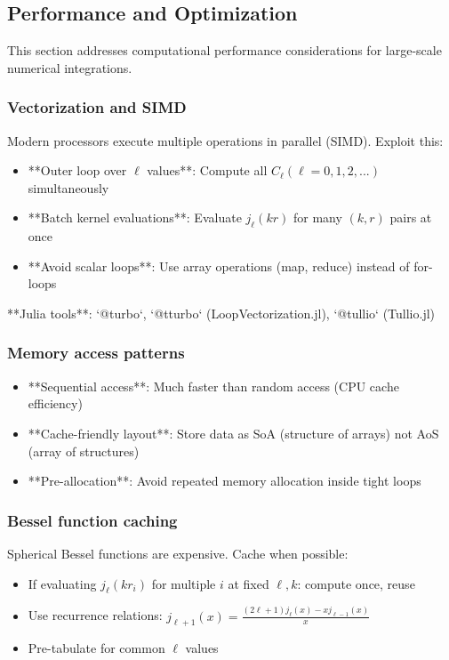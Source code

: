 \subsection{Performance and Optimization}\label{subsec:num_performance}

This section addresses computational performance considerations for large-scale numerical integrations.

\subsubsection{Vectorization and SIMD}

Modern processors execute multiple operations in parallel (SIMD). Exploit this:

\begin{itemize}
    \item **Outer loop over $\ell$ values**: Compute all $C_\ell(\ell=0,1,2,...)$ simultaneously
    \item **Batch kernel evaluations**: Evaluate $j_\ell(kr)$ for many $(k, r)$ pairs at once
    \item **Avoid scalar loops**: Use array operations (map, reduce) instead of for-loops
\end{itemize}

**Julia tools**: `@turbo`, `@tturbo` (LoopVectorization.jl), `@tullio` (Tullio.jl)

\subsubsection{Memory access patterns}

\begin{itemize}
    \item **Sequential access**: Much faster than random access (CPU cache efficiency)
    \item **Cache-friendly layout**: Store data as SoA (structure of arrays) not AoS (array of structures)
    \item **Pre-allocation**: Avoid repeated memory allocation inside tight loops
\end{itemize}

\subsubsection{Bessel function caching}

Spherical Bessel functions are expensive. Cache when possible:

\begin{itemize}
    \item If evaluating $j_\ell(kr_i)$ for multiple $i$ at fixed $\ell, k$: compute once, reuse
    \item Use recurrence relations: $j_{\ell+1}(x) = \frac{(2\ell+1) j_\ell(x) - x j_{\ell-1}(x)}{x}$
    \item Pre-tabulate for common $\ell$ values
\end{itemize}


